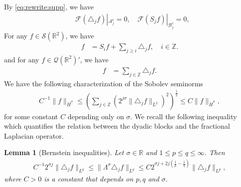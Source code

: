 \documentclass[twoside, reqno]{amsart}
\newtheorem{lemma}{Lemma}
\numberwithin{lemma}{section}
\numberwithin{theorem}{section}
\numberwithin{proposition}{section}
\numberwithin{equation}{section} %
\newcommand{\lpj}{\triangle_j}
\newcommand{\Acal}{\mathcal{A}}
\newcommand{\Sob}[2]{\lVert#1\rVert_{#2}}
\newcommand{\nrm}[1]{\lVert#1\rVert}
\newcommand{\RR}{\mathbb{R}}
\newcommand{\ZZ}{\mathbb{Z}}
\newcommand{\Bcal}{\mathcal{B}}
\newcommand{\Lam}{\Lambda}
\newcommand{\si}{\sigma}
\begin{document}
    By \eqref{eq:rewrite:supp}, we have
	\begin{align*}
	&\mathcal{F}({\lpj}f)|_{{\Acal}_j^c}=0,\quad
	\mathcal{F}(S_{j}f)|_{{\Bcal}_j^{c}}=0,
	\end{align*}
    For any $f \in \mathscr{S}(\RR^2)$, we have
    \begin{align*}
         f&=S_if+\sum_{j\geq i}\lpj f,\quad i\in\ZZ.
    \end{align*}
	and for any $f\in\mathscr{Q}(\RR^2)'$, we have
	    \begin{align*}
	        f&=\sum_{j\in\ZZ}\lpj f.
	    \end{align*}
We have the following characterization of the Sobolev seminorms
	    \begin{align*}
	       C^{-1}\Sob{f}{\dot{H}^\si}\leq \left(\sum_{j\in \mathbb{Z}}\left(2^{j\si}\nrm{\lpj f}_{L^2}\right)^{2}\right)^{\frac{1}{2}}\leq C\Sob{f}{\dot{H}^\si},
	    \end{align*}
	for some constant $C$ depending only on $\si$. 
    We recall the following inequality which quantifies the relation between the dyadic blocks and the fractional Laplacian operator.
	\begin{lemma}
	    [Bernstein inequalities]\label{T:Bernstein}
		Let $\si\in\RR$ and $1\le p \le q\le \infty$. Then
		\begin{align*}
	C^{-1}2^{\si j}\nrm{{\lpj}f}_{L^q}\le \nrm{\Lam^{\si}{\lpj}f}_{L^q}\le C 2^{\si j+2j(\frac{1}{p}-\frac{1}{q})}\nrm{{\lpj}f}_{L^p},
		\end{align*}
	 where $C>0$ is a constant that depends on $p,q$ and $\si$.
	\end{lemma}
    
\end{document}
